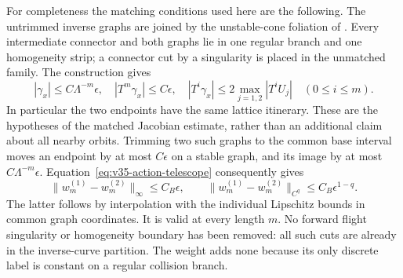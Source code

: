 For completeness the matching conditions used here are the following.
The untrimmed inverse graphs are joined by the unstable-cone foliation
of \cite[Lemma 3.3 and Section 4.3]{DZ}. Every intermediate connector
and both graphs lie in one regular branch and one homogeneity strip;
a connector cut by a singularity is placed in the unmatched family.
The construction gives
\[
 |\gamma_x|\le C\Lambda^{-m}\epsilon,\quad
 |T^m\gamma_x|\le C\epsilon,\quad
 |T^i\gamma_x|\le2\max_{j=1,2}|T^iU_j|\quad(0\le i\le m).
\]
In particular the two endpoints have the same lattice itinerary. These
are the hypotheses of the matched Jacobian estimate, rather than an
additional claim about all nearby orbits. Trimming two such graphs to
the common base interval moves an endpoint by at most $C\epsilon$
on a stable graph, and its image by at most $C\Lambda^{-m}\epsilon$.
Equation~\eqref{eq:v35-action-telescope} consequently gives
\begin{equation}\label{eq:v35-weight-match-detail}
 \|w_m^{(1)}-w_m^{(2)}\|_\infty\le C_B\epsilon,
 \qquad
 \|w_m^{(1)}-w_m^{(2)}\|_{C^q}\le C_B\epsilon^{1-q}.
\end{equation}
The latter follows by interpolation with the individual Lipschitz
bounds in common graph coordinates. It is valid at every length $m$.
No forward flight singularity or homogeneity boundary has been removed:
all such cuts are already in the inverse-curve partition. The weight
adds none because its only discrete label is constant on a regular
collision branch.

